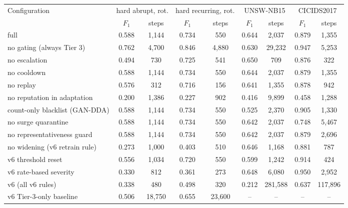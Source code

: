 \begin{tabular}{@{}lcccccccc@{}}
\toprule
Configuration & \multicolumn{2}{c}{hard abrupt, rot.} & \multicolumn{2}{c}{hard recurring, rot.} & \multicolumn{2}{c}{UNSW-NB15} & \multicolumn{2}{c}{CICIDS2017} \\
 & $F_1$ & steps & $F_1$ & steps & $F_1$ & steps & $F_1$ & steps \\
\midrule
full \drift{} & 0.588 & 1,144 & 0.734 & 550 & 0.644 & 2,037 & 0.879 & 1,355 \\
no gating (always Tier 3) & 0.762 & 4,700 & 0.846 & 4,880 & 0.630 & 29,232 & 0.947 & 5,253 \\
no escalation & 0.494 & 730 & 0.725 & 541 & 0.650 & 709 & 0.876 & 322 \\
no cooldown & 0.588 & 1,144 & 0.734 & 550 & 0.644 & 2,037 & 0.879 & 1,355 \\
no replay & 0.576 & 312 & 0.716 & 156 & 0.641 & 1,355 & 0.878 & 942 \\
no reputation in adaptation & 0.200 & 1,386 & 0.227 & 902 & 0.416 & 9,899 & 0.458 & 1,288 \\
count-only blacklist (GAN-DDA) & 0.588 & 1,144 & 0.734 & 550 & 0.525 & 2,370 & 0.905 & 1,330 \\
no surge quarantine & 0.588 & 1,144 & 0.734 & 550 & 0.642 & 2,037 & 0.748 & 5,467 \\
no representativeness guard & 0.588 & 1,144 & 0.734 & 550 & 0.642 & 2,037 & 0.879 & 2,696 \\
no widening (v6 retrain rule) & 0.273 & 1,000 & 0.403 & 510 & 0.646 & 1,168 & 0.881 & 787 \\
v6 threshold reset & 0.556 & 1,034 & 0.720 & 550 & 0.599 & 1,242 & 0.914 & 424 \\
v6 rate-based severity & 0.330 & 812 & 0.361 & 273 & 0.648 & 6,080 & 0.950 & 2,952 \\
v6 \drift{} (all v6 rules) & 0.338 & 480 & 0.498 & 320 & 0.212 & 281,588 & 0.637 & 117,896 \\
v6 Tier-3-only baseline & 0.506 & 18,750 & 0.655 & 23,600 & -- & -- & -- & -- \\
\bottomrule
\end{tabular}